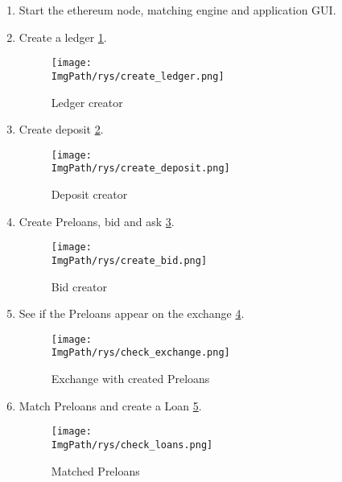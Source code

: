 \documentclass[a4paper,12pt,twoside,openany]{report}
\newcommand{\ImgPath}{.}
\begin{document}
\begin{enumerate}
\item Start the ethereum node, matching engine and application GUI.
\item Create a ledger \ref{create ledger}.

\begin{figure}[!htbp]
	\begin{center}
\centering
\texttt{[image: \\ImgPath/rys/create\_ledger.png]}
\end{center}
	\caption{Ledger creator}
	\label{create ledger}
\end{figure}

\item Create deposit \ref{create deposit}.

\begin{figure}[!htbp]
	\begin{center}
\centering
\texttt{[image: \\ImgPath/rys/create\_deposit.png]}
\end{center}
	\caption{Deposit creator}
	\label{create deposit}
\end{figure}

\item Create Preloans, bid and ask \ref{create bid}.

\begin{figure}[!htbp]
	\begin{center}
\centering
\texttt{[image: \\ImgPath/rys/create\_bid.png]}
\end{center}
	\caption{Bid creator}
	\label{create bid}
\end{figure}

\item See if the Preloans appear on the exchange \ref{check exchange}.

\begin{figure}[!htbp]
	\begin{center}
\centering
\texttt{[image: \\ImgPath/rys/check\_exchange.png]}
\end{center}
	\caption{Exchange with created Preloans}
	\label{check exchange}
\end{figure}

\item Match Preloans and create a Loan \ref{check loans}.

\begin{figure}[!htbp]
	\begin{center}
\centering
\texttt{[image: \\ImgPath/rys/check\_loans.png]}
\end{center}
	\caption{Matched Preloans}
	\label{check loans}
\end{figure}


\end{enumerate}
\end{document}
